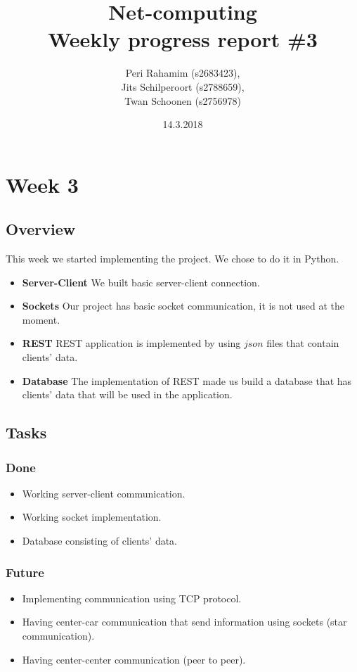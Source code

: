 \documentclass[a4paper]{article}
\begin{document}
\title{Net-computing\\
Weekly progress report \#3
}

\date{14.3.2018}

\author{Peri Rahamim (s2683423),\\
Jits Schilperoort (s2788659),\\
Twan Schoonen (s2756978)
}


\maketitle
\section*{Week 3}
\subsection*{Overview}
This week we started implementing the project. We chose to do it in Python. 
\begin{itemize}
    \item \textbf{Server-Client} We built basic server-client connection.
	\item \textbf{Sockets} Our project has basic socket communication, it is not used at the moment.
	\item \textbf{REST} REST application is implemented by using $json$ files that contain clients' data.
	\item \textbf{Database} The implementation of REST made us build a database that has clients' data that will be used in the application.
\end{itemize}

\subsection*{Tasks}
\subsubsection*{Done}
\begin{itemize}
    \item Working server-client communication.
    \item Working socket implementation.
    \item Database consisting of clients' data.
\end{itemize}

\subsubsection*{Future}
\begin{itemize}
    \item Implementing communication using TCP protocol.
    \item Having center-car communication that send information using sockets (star communication).
    \item Having center-center communication (peer to peer).
\end{itemize}
\end{document}
